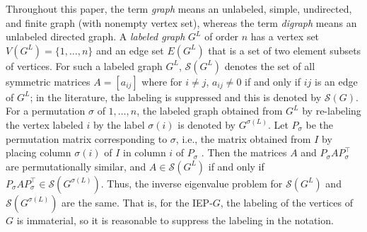 \documentclass[12pt]{article}
\theoremstyle{definition}
\theoremstyle{definition}
\theoremstyle{definition}
\numberwithin{figure}{section}
\numberwithin{equation}{section}
\newcommand{\GLG}{G^L}
\newcommand{\GLGsig}{G^{\sigma(L)}}
\newcommand{\sym}{\mathcal{S}}
\begin{document}
 Throughout this paper,  the term \emph{graph} means {an unlabeled,} simple, undirected, and finite graph (with nonempty vertex set), whereas the term \emph{digraph} means {an unlabeled} directed graph.
 A \emph{labeled graph} $G^L$ of order $n$ has a vertex set $V(G^L)=\{1,\dots,n\}$ and  an edge set $E(G^L)$ that is a set of two element subsets of vertices. For such a labeled graph $G^L$,   $\sym(\GLG)$   denotes the set of all symmetric  matrices $A=[a_{ij}]$ 
 where for $i\ne j$, $a_{ij}\neq 0$ if and only if   $ij$ is an edge of $G^L$; in the literature, the labeling is suppressed and this is denoted by $\sym(G)$. 
 For a permutation $\sigma$ of $1,\ldots, n$,  the labeled graph obtained from $G^L$ by re-labeling 
the vertex labeled $i$ by the label $\sigma(i)$ is  denoted by $\GLGsig$. Let $P_{\sigma}$ be the permutation matrix corresponding to $\sigma$, i.e., the matrix obtained from $I$ by placing column $\sigma(i)$ of $I$ in column $i$ of $P_{\sigma}$ .
Then the  matrices $A$ and $P_\sigma AP_\sigma^\top$ are permutationally similar, and 
$A \in  \sym(\GLG)$ if and only if $P{_\sigma} A P_\sigma^\top \in  \sym(\GLGsig)$.
 Thus, the inverse eigenvalue problem for $\sym(\GLG)$ and $\sym(\GLGsig)$
are the same. That is, for  the IEP-$G$,  the labeling of the vertices of $G$ is immaterial, so it is reasonable to suppress the labeling in the notation. 
\end{document}
